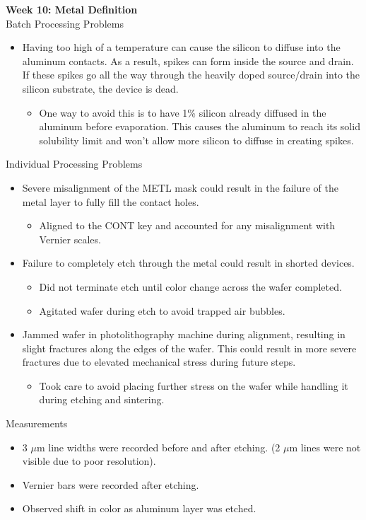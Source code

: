 \documentclass{article}
\begin{document}
\textbf{Week 10: Metal Definition} \\
Batch Processing Problems
\begin{itemize}
\item Having too high of a temperature can cause the silicon to diffuse into the aluminum contacts. As a result, spikes can form inside the source and drain. If these spikes go all the way through the heavily doped source/drain into the silicon substrate, the device is dead.
	\begin{itemize}
	\item One way to avoid this is to have 1\% silicon already diffused in the aluminum before evaporation. This causes the aluminum to reach its solid solubility limit and won't allow more silicon to diffuse in creating spikes.
	\end{itemize}
\end{itemize}
Individual Processing Problems
\begin{itemize}
\item  Severe misalignment of the METL mask could result in the failure of the metal layer to fully fill the contact holes.
	\begin{itemize}
	\item Aligned to the CONT key and accounted for any misalignment with Vernier scales.
	\end{itemize}
\item Failure to completely etch through the metal could result in shorted devices.
	\begin{itemize}
	\item Did not terminate etch until color change across the wafer completed.
	\item Agitated wafer during etch to avoid trapped air bubbles.
	\end{itemize}
\item Jammed wafer in photolithography machine during alignment, resulting in slight fractures along the edges of the wafer. This could result in more severe fractures due to elevated mechanical stress during future steps.
	\begin{itemize}
	\item Took care to avoid placing further stress on the wafer while handling it during etching and sintering.
	\end{itemize}
\end{itemize}
Measurements
\begin{itemize}
\item  3 $\mu$m line widths were recorded before and after etching. (2 $\mu$m lines were not visible due to poor resolution).
\item Vernier bars were recorded after etching.
\item Observed shift in color as aluminum layer was etched.
\end{itemize}
\end{document}
